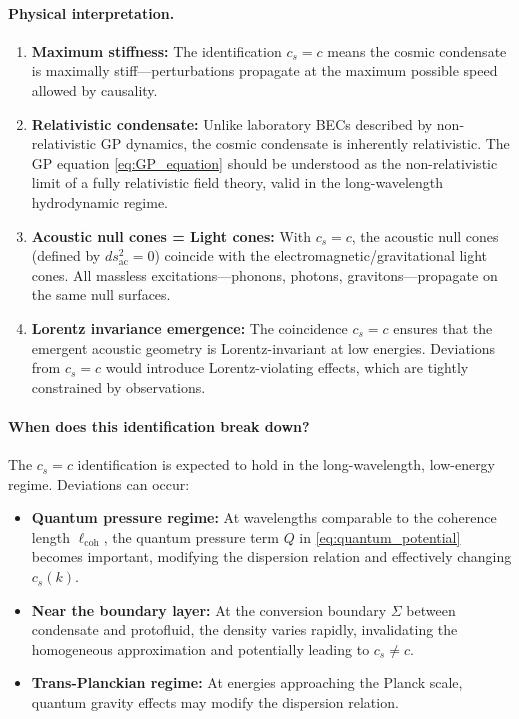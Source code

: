 \paragraph{Physical interpretation.}
\begin{enumerate}[leftmargin=2.2em]
    \item \textbf{Maximum stiffness:} The identification $c_s = c$ means the cosmic condensate is maximally stiff---perturbations propagate at the maximum possible speed allowed by causality.

    \item \textbf{Relativistic condensate:} Unlike laboratory BECs described by non-relativistic GP dynamics, the cosmic condensate is inherently relativistic. The GP equation \eqref{eq:GP_equation} should be understood as the non-relativistic limit of a fully relativistic field theory, valid in the long-wavelength hydrodynamic regime.

    \item \textbf{Acoustic null cones = Light cones:} With $c_s = c$, the acoustic null cones (defined by $ds_{\mathrm{ac}}^2 = 0$) coincide with the electromagnetic/gravitational light cones. All massless excitations---phonons, photons, gravitons---propagate on the same null surfaces.

    \item \textbf{Lorentz invariance emergence:} The coincidence $c_s = c$ ensures that the emergent acoustic geometry is Lorentz-invariant at low energies. Deviations from $c_s = c$ would introduce Lorentz-violating effects, which are tightly constrained by observations.
\end{enumerate}

\paragraph{When does this identification break down?}
The $c_s = c$ identification is expected to hold in the long-wavelength, low-energy regime. Deviations can occur:
\begin{itemize}[leftmargin=1.8em]
    \item \textbf{Quantum pressure regime:} At wavelengths comparable to the coherence length $\ell_{\mathrm{coh}}$, the quantum pressure term $Q$ in \eqref{eq:quantum_potential} becomes important, modifying the dispersion relation and effectively changing $c_s(k)$.

    \item \textbf{Near the boundary layer:} At the conversion boundary $\Sigma$ between condensate and protofluid, the density varies rapidly, invalidating the homogeneous approximation and potentially leading to $c_s \neq c$.

    \item \textbf{Trans-Planckian regime:} At energies approaching the Planck scale, quantum gravity effects may modify the dispersion relation.
\end{itemize}

